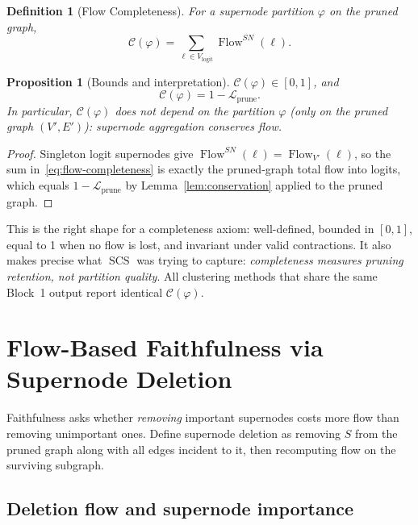 \documentclass[11pt]{article}
\DeclareMathOperator{\Flow}{Flow}
\DeclareMathOperator{\SCS}{SCS}
\newtheorem{definition}{Definition}
\newtheorem{proposition}{Proposition}
\begin{document}
\begin{definition}[Flow Completeness]\label{def:flow-completeness}
For a supernode partition $\varphi$ on the pruned graph,
\begin{equation}
\mathcal{C}(\varphi) = \sum_{\ell \in V_{\text{logit}}} \Flow^{SN}(\ell).
\label{eq:flow-completeness}
\end{equation}
\end{definition}

\begin{proposition}[Bounds and interpretation]
$\mathcal{C}(\varphi) \in [0, 1]$, and
\begin{equation}
\mathcal{C}(\varphi) = 1 - \mathcal{L}_{\text{prune}}.
\label{eq:completeness-equals-retention}
\end{equation}
In particular, $\mathcal{C}(\varphi)$ does not depend on the
partition $\varphi$ (only on the pruned graph $(V', E')$): supernode
aggregation conserves flow.
\end{proposition}

\begin{proof}
Singleton logit supernodes give
$\Flow^{SN}(\ell) = \Flow_{V'}(\ell)$, so the sum
in~\eqref{eq:flow-completeness} is exactly the pruned-graph total
flow into logits, which equals $1 - \mathcal{L}_{\text{prune}}$ by
Lemma~\ref{lem:conservation} applied to the pruned graph.
\end{proof}

This is the right shape for a completeness axiom: well-defined,
bounded in $[0, 1]$, equal to 1 when no flow is lost, and invariant
under valid contractions. It also makes precise what $\SCS$ was
trying to capture: \emph{completeness measures pruning retention,
not partition quality}. All clustering methods that share the same
Block~1 output report identical $\mathcal{C}(\varphi)$.

\section{Flow-Based Faithfulness via Supernode Deletion}\label{sec:faithfulness}

Faithfulness asks whether \emph{removing} important supernodes
costs more flow than removing unimportant ones. Define supernode
deletion as removing $S$ from the pruned graph along with all
edges incident to it, then recomputing flow on the surviving
subgraph.

\subsection{Deletion flow and supernode importance}
\end{document}
